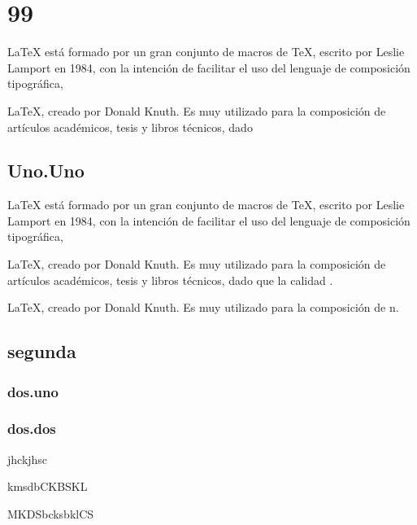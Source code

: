 \chapter{99}

\photon \photon \photon \photon \photon \photon 


	\LaTeX{} está formado por un gran conjunto de macros de TeX, escrito por Leslie Lamport en 1984, con la intención de facilitar el uso del lenguaje de composición tipográfica, 

	\LaTeX{}, creado por Donald Knuth. Es muy utilizado para la composición de artículos académicos, tesis y libros técnicos, dado 

\section{Uno.Uno}

	\LaTeX{} está formado por un gran conjunto de macros de TeX, escrito por Leslie Lamport en 1984, con la intención de facilitar el uso del lenguaje de composición tipográfica, 

\begin{destacado}
		\LaTeX{}, creado por Donald Knuth. Es muy utilizado para la composición de artículos académicos, tesis y libros técnicos, dado que la calidad .
\end{destacado}





		\LaTeX{}, creado por Donald Knuth. Es muy utilizado para la composición de n.





\section{segunda}

\subsection{dos.uno}
\subsection{dos.dos}



\begin{theorem}
jhckjhsc

kmsdbCKBSKL

MKDSbcksbklCS	
\end{theorem}

